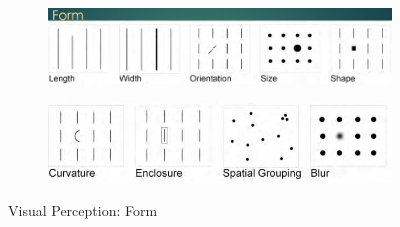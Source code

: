 \documentclass[11pt,fleqn]{book} %
\begin{document}
\begin{figure}[htb!]
    \centering
    \begin{subfigure}[c]{0.45\linewidth}
        \includegraphics[width=\linewidth]{Pictures/visual-perception-form1.png}
        \label{fig:form1}
    \end{subfigure}
    \begin{subfigure}[c]{0.45\linewidth}
        \includegraphics[width=\linewidth]{Pictures/visual-perception-form2.png}
        \label{fig:form2}
    \end{subfigure}
    \caption{Visual Perception: Form}
    \label{fig:visual-perception-form}
\end{figure}
\end{document}
